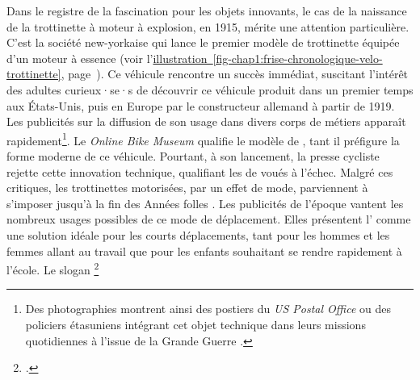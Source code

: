 \begin{refsegment}
Dans le registre de la fascination pour les objets innovants, le cas de la naissance de la trottinette à moteur à explosion, en 1915, mérite une attention particulière. C’est la société new-yorkaise  qui lance le premier modèle de trottinette équipée d’un moteur à essence (voir l'\hyperref[fig-chap1:frise-chronologique-velo-trottinette]{illustration~\ref{fig-chap1:frise-chronologique-velo-trottinette}}, page~\pageref{fig-chap1:frise-chronologique-velo-trottinette}). Ce véhicule rencontre un succès immédiat, suscitant l’intérêt des adultes curieux·se·s de découvrir ce véhicule produit dans un premier temps aux États-Unis, puis en Europe par le constructeur allemand  à partir de 1919. Les publicités sur la diffusion de son usage dans divers corps de métiers apparaît rapidement\footnote{
    Des photographies montrent ainsi des postiers du \textit{US Postal Office} ou des policiers étasuniens intégrant cet objet technique dans leurs missions quotidiennes à l’issue de la Grande Guerre \textcolor{blue}{\autocite{ma_trott_origines_2019}}.
}. Le \textsl{Online Bike Museum} qualifie le modèle  de , tant il préfigure la forme moderne de ce véhicule. Pourtant, à son lancement, la presse cycliste rejette cette innovation technique, qualifiant les  de  voués à l’échec. Malgré ces critiques, les trottinettes motorisées, par un effet de mode, parviennent à s’imposer jusqu’à la fin des Années folles \textcolor{blue}{\autocite{smithsonian_magazine_motorized_2019}}. Les publicités de l’époque vantent les nombreux usages possibles de ce mode de déplacement. Elles présentent l’ comme une solution idéale pour les courts déplacements, tant pour les hommes et les femmes allant au travail que pour les enfants souhaitant se rendre rapidement à l’école. Le slogan \footnote{
     \textcolor{blue}{\autocite{smithsonian_magazine_motorized_2019}}.
}
\end{refsegment}
